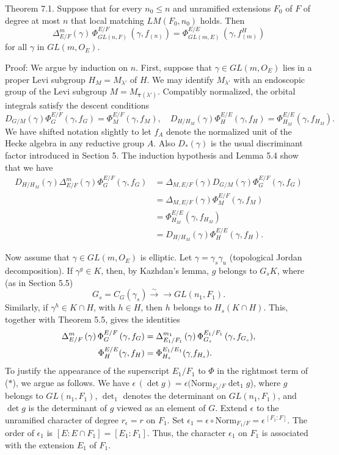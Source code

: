 \documentclass{amsart}
\begin{document}
\proclaim Theorem {7.1}.
Suppose that for every
  $ n_0 \leq n $
and unramified extensions $F_0$ of $F$ of degree at most $n$ that
local matching
  $ LM(F_0, n_0 ) $
holds.
Then
%
$$
  \Delta_{E/F}^{m}
  (\gamma) \,
  \Phi_{GL(n, F)}^{E/F} \,
  (\gamma, f_{(n)}) =
  \Phi_{GL(m, E)}^{E/E} \,
  (\gamma, f^H_{(m)})
$$
%
for all
  $ \gamma $
in
  $ GL(m, O_E )$.
\finishproclaim

\pproclaim Proof:
We argue by
induction on $n$.
First, suppose that $\gamma\in GL(m,O_E)$ lies in a proper Levi
subgroup $H_M=M_{\lambda'}$ of $H$.  We may identify $M_{\lambda'}$ with
an endoscopic group of the Levi subgroup $M = M_{\pmb\tau(\lambda')}$.
Compatibly normalized, the orbital integrals satisfy  the descent conditions
$$D_{G/M}(\gamma)\Phi^{E/F}_G(\gamma,f_G) = \Phi^{E/F}_{M}(\gamma,f_M),\quad
  D_{H/H_M}(\gamma)\Phi^{E/E}_H(\gamma,f_H) = \Phi^{E/E}_{H_M}(\gamma,
  f_{H_M}).$$
We have shifted notation slightly to let $f_A$ denote the normalized unit
of the Hecke algebra in any reductive group $A$.  Also $D_*(\gamma)$ is the
usual discriminant factor introduced in Section 5.
%
The induction hypothesis and Lemma 5.4 show that we have
\begin{align*}
D_{H/H_M}(\gamma)\Delta^m_{E/F}(\gamma)\Phi^{E/F}_G(\gamma,f_G) &=
	\Delta_{M,E/F}(\gamma) D_{G/M}(\gamma)\Phi^{E/F}_G(\gamma,f_G)\\
	&= \Delta_{M,E/F}(\gamma) \Phi^{E/F}_M(\gamma,f_M)\\
	&=  \Phi^{E/E}_{H_M}(\gamma,f_{H_M}) \\
	&= D_{H/H_M}(\gamma)\Phi^{E/E}_H(\gamma,f_H).
\end{align*}

Now assume that $\gamma\in GL(m,O_E)$ is elliptic.
Let
  $ \gamma = \gamma_s \gamma_u $
(topological Jordan decomposition).
If
  $ \gamma^g \in K $,
then, by Kazhdan's lemma,
  $g$ belongs to $G_s K$, where (as in Section 5.5)
%
$$
  G_s = C_G(\gamma_s) 
  \overset \sim \to \to
  GL (n_1, F_1).
$$
Similarly, if $\gamma^h\in K\cap H$, with $h\in H$, then $h$ belongs
to $H_s(K\cap H)$.
%
This, together with Theorem 5.5, gives the identities
%
\begin{align}\label{eqn:star2}
 \Delta_{E/F}^m \,
  (\gamma) \,
  \Phi_G^{E/F} \,
  (\gamma, f_G ) &=
  \Delta_{E_1/F_1}^{m_1} \,
  (\gamma) \,
  \Phi_{G_s}^{E_1/F_1} \,
  (\gamma, f_{G_s}),\\ 
  \vspace{4pt}
  \Phi^{E/E}_H(\gamma,f_H) &= \Phi^{E_1/E_1}_{H_s}(\gamma_,f_{H_s}).
\end{align}
%
To justify the appearance of the superscript
  $ E_1 / F_1 $
to
  $ \Phi $
in the rightmost term of ($*$), we argue as follows.
We have   $ \epsilon \, (\det g) =
    \epsilon (\text{Norm}_{F_1/F}\det_1
    g$),
where $g$ belongs to $GL(n_1,F_1)$, $\det_1$ denotes the
determinant on $GL(n_1,F_1)$, and $\det g$ is the determinant
of $g$ viewed as an element of $G$.
Extend
  $ \epsilon $
to the unramified character of degree
  $ r_{\epsilon} = r $
on 
  $ F_1 $.
Set $\epsilon_1 = 
   \epsilon \circ \text{Norm}_{F_1/F} =
    \epsilon^{\,[F_1:F]}$.
The order of
  $ \epsilon_1 $
is 
  $ [E: E\cap F_1] = [E_1 : F_1 ] $.
Thus, the character
  $ \epsilon_1 $ 
on 
  $ F_1 $
is associated with the extension 
  $ E_1 $ of
  $ F_1 $.
\end{document}
